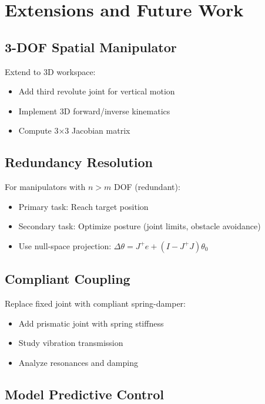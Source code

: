 \documentclass[11pt,a4paper]{article}
\begin{document}
\section{Extensions and Future Work}

\subsection{3-DOF Spatial Manipulator}

Extend to 3D workspace:
\begin{itemize}
    \item Add third revolute joint for vertical motion
    \item Implement 3D forward/inverse kinematics
    \item Compute 3×3 Jacobian matrix
\end{itemize}

\subsection{Redundancy Resolution}

For manipulators with $n > m$ DOF (redundant):
\begin{itemize}
    \item Primary task: Reach target position
    \item Secondary task: Optimize posture (joint limits, obstacle avoidance)
    \item Use null-space projection: $\Delta\theta = J^+ e + (I - J^+ J) \theta_0$
\end{itemize}

\subsection{Compliant Coupling}

Replace fixed joint with compliant spring-damper:
\begin{itemize}
    \item Add prismatic joint with spring stiffness
    \item Study vibration transmission
    \item Analyze resonances and damping
\end{itemize}

\subsection{Model Predictive Control}
\end{document}
